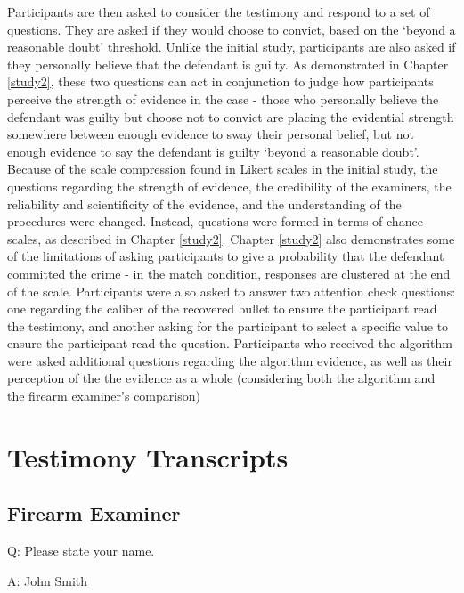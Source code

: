 \documentclass[print]{nuthesis}
\begin{document}
Participants are then asked to consider the testimony and respond to a set of questions.
They are asked if they would choose to convict, based on the `beyond a reasonable doubt' threshold.
Unlike the initial study, participants are also asked if they personally believe that the defendant is guilty.
As demonstrated in Chapter \ref{study2}, these two questions can act in conjunction to judge how participants perceive the strength of evidence in the case - those who personally believe the defendant was guilty but choose not to convict are placing the evidential strength somewhere between enough evidence to sway their personal belief, but not enough evidence to say the defendant is guilty `beyond a reasonable doubt'.
Because of the scale compression found in Likert scales in the initial study, the questions regarding the strength of evidence, the credibility of the examiners, the reliability and scientificity of the evidence, and the understanding of the procedures were changed.
Instead, questions were formed in terms of chance scales, as described in Chapter \ref{study2}.
Chapter \ref{study2} also demonstrates some of the limitations of asking participants to give a probability that the defendant committed the crime - in the match condition, responses are clustered at the end of the scale.
Participants were also asked to answer two attention check questions: one regarding the caliber of the recovered bullet to ensure the participant read the testimony, and another asking for the participant to select a specific value to ensure the participant read the question.
Participants who received the algorithm were asked additional questions regarding the algorithm evidence, as well as their perception of the the evidence as a whole (considering both the algorithm and the firearm examiner's comparison)

\appendix

\hypertarget{testimony-transcripts}{%
\chapter{Testimony Transcripts}\label{testimony-transcripts}}

\hypertarget{firearm-examiner}{%
\section{Firearm Examiner}\label{firearm-examiner}}

Q: Please state your name.

A: John Smith
\end{document}
